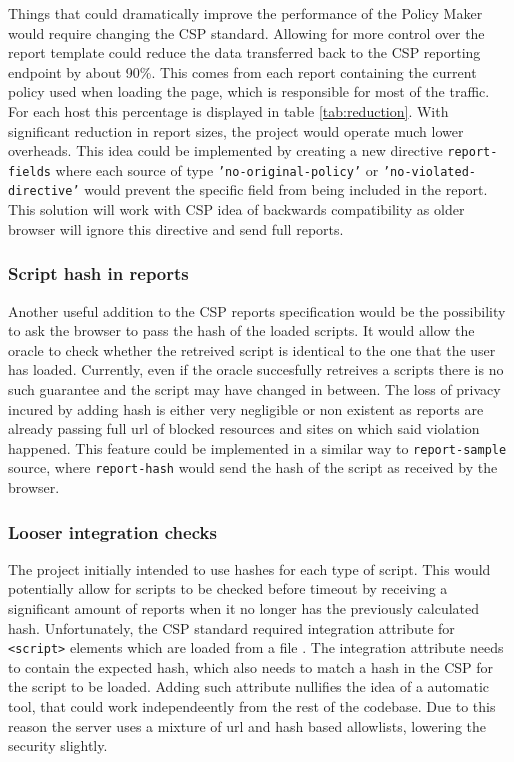 Things that could dramatically improve the performance of the Policy Maker would require changing the CSP standard.
Allowing for more control over the report template could reduce the data transferred back to the CSP reporting endpoint by about 90\%.
This comes from each report containing the current policy used when loading the page, which is responsible for most of the traffic.
For each host this percentage is displayed in table \ref{tab:reduction}.
With significant reduction in report sizes, the project would operate much lower overheads.
This idea could be implemented by creating a new directive \texttt{report-fields} where each source of type \texttt{'no-original-policy'} or \texttt{'no-violated-directive'} would prevent the specific field from being included in the report.
This solution will work with CSP idea of backwards compatibility as older browser will ignore this directive and send full reports.



\subsubsection{Script hash in reports}

Another useful addition to the CSP reports specification would be the possibility to ask the browser to pass the hash of the loaded scripts.
It would allow the oracle to check whether the retreived script is identical to the one that the user has loaded.
Currently, even if the oracle succesfully retreives a scripts there is no such guarantee and the script may have changed in between.
The loss of privacy incured by adding hash is either very negligible or non existent as reports are already passing full url of blocked resources and sites on which said violation happened.
This feature could be implemented in a similar way to \texttt{report-sample} source, where \texttt{report-hash} would send the hash of the script as received by the browser.

\subsubsection{Looser integration checks}

The project initially intended to use hashes for each type of script. 
This would potentially allow for scripts to be checked before timeout by receiving a significant amount of reports when it no longer has the previously calculated hash.
Unfortunately, the CSP standard required integration attribute for \texttt{<script>} elements which are loaded from a file \cite{externalHash}.
The integration attribute needs to contain the expected hash, which also needs to match a hash in the CSP for the script to be loaded.
Adding such attribute nullifies the idea of a automatic tool, that could work independeently from the rest of the codebase.
Due to this reason the server uses a mixture of url and hash based allowlists, lowering the security slightly.

